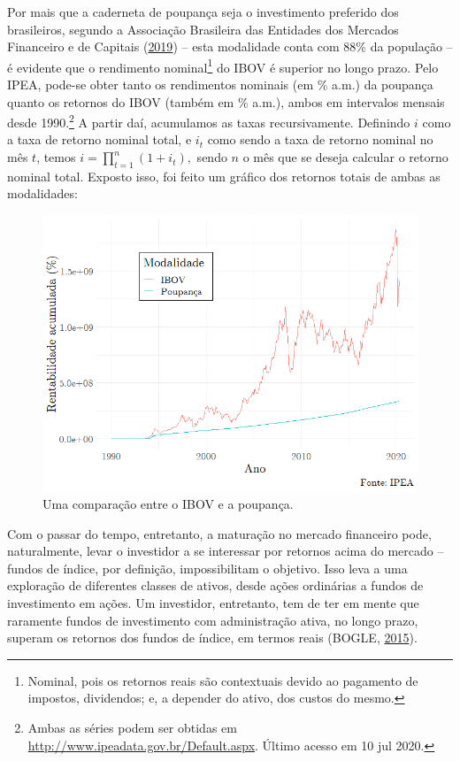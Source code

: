 \documentclass[grad,numbers]{coppe}
\begin{document}
  Por mais que a caderneta de poupança seja o investimento preferido dos brasileiros, segundo a Associação Brasileira das Entidades dos Mercados Financeiro e de Capitais (\protect\hyperlink{ref-anbima2019}{2019}) -- esta modalidade conta com 88\% da população -- é evidente que o rendimento nominal\footnote{Nominal, pois os retornos reais são contextuais devido ao pagamento de impostos, dividendos; e, a depender do ativo, dos custos do mesmo.} do IBOV é superior no longo prazo. Pelo IPEA, pode-se obter tanto os rendimentos nominais (em \% a.m.) da poupança quanto os retornos do IBOV (também em \% a.m.), ambos em intervalos mensais desde 1990.\footnote{Ambas as séries podem ser obtidas em \url{http://www.ipeadata.gov.br/Default.aspx}. Último acesso em 10 jul 2020.} A partir daí, acumulamos as taxas recursivamente. Definindo \(i\) como a taxa de retorno nominal total, e \(i_t\) como sendo a taxa de retorno nominal no mês \(t\), temos \(i = \prod_{t=1}^n (1+i_t),\) sendo \(n\) o mês que se deseja calcular o retorno nominal total. Exposto isso, foi feito um gráfico dos retornos totais de ambas as modalidades:
  \begin{figure}[H]
  \includegraphics[width=1\linewidth]{img/ibov-poupanca} \caption{Uma comparação entre o IBOV e a poupança.}\label{fig:unnamed-chunk-1}
  \end{figure}
  Com o passar do tempo, entretanto, a maturação no mercado financeiro pode, naturalmente, levar o investidor a se interessar por retornos acima do mercado -- fundos de índice, por definição, impossibilitam o objetivo. Isso leva a uma exploração de diferentes classes de ativos, desde ações ordinárias a fundos de investimento em ações. Um investidor, entretanto, tem de ter em mente que raramente fundos de investimento com administração ativa, no longo prazo, superam os retornos dos fundos de índice, em termos reais (BOGLE, \protect\hyperlink{ref-bogle2015}{2015}).
\end{document}
